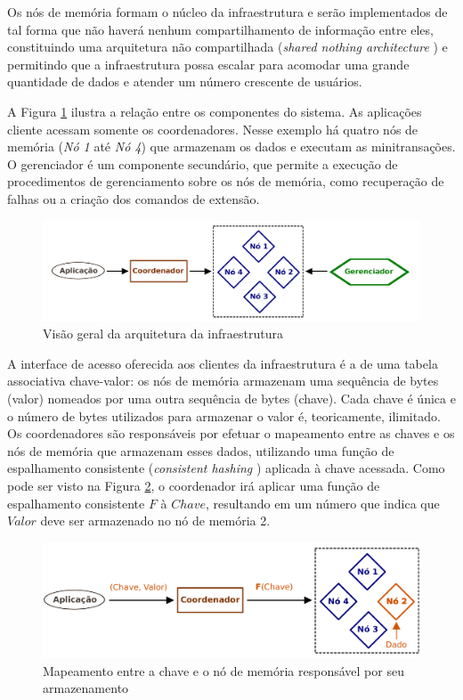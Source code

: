 \documentclass[11pt,twoside,a4paper]{book}
\begin{document}
Os nós de memória formam o núcleo da infraestrutura e serão implementados de tal forma que não haverá nenhum compartilhamento de informação entre eles, constituindo uma arquitetura não compartilhada (\emph{shared nothing architecture} \cite{shared_nothing}) e permitindo que a infraestrutura possa escalar para acomodar uma grande quantidade de dados e atender um número crescente de usuários.

A Figura \ref{fig:overview_arquitetura} ilustra a relação entre os componentes do sistema. As aplicações cliente acessam somente os coordenadores. Nesse exemplo há quatro nós de memória (\emph{Nó 1} até \emph{Nó 4}) que armazenam os dados e executam as minitransações. O gerenciador é um componente secundário, que permite a execução de procedimentos de gerenciamento sobre os nós de memória, como recuperação de falhas ou a criação dos comandos de extensão.

\begin{figure}
  \centering
  \includegraphics[width=.90\textwidth]{overview_arquitetura} 
  \caption{Visão geral da arquitetura da infraestrutura}
  \label{fig:overview_arquitetura} 
\end{figure}

A interface de acesso oferecida aos clientes da infraestrutura é a de uma tabela associativa chave-valor: os nós de memória armazenam uma sequência de bytes (valor) nomeados por uma outra sequência de bytes (chave). Cada chave é única e o número de bytes utilizados para armazenar o valor é, teoricamente, ilimitado. Os coordenadores são responsáveis por efetuar o mapeamento entre as chaves e os nós de memória que armazenam esses dados, utilizando uma função de espalhamento consistente (\emph{consistent hashing} \cite{consistent_hashing}) aplicada à chave acessada. Como pode ser visto na Figura \ref{fig:funcao_espalhamento}, o coordenador irá aplicar uma função de espalhamento consistente \textbf{$F$} à $Chave$, resultando em um número que indica que $Valor$ deve ser armazenado no nó de memória 2. 

\begin{figure}
  \centering
  \includegraphics[width=.80\textwidth]{funcao_espalhamento} 
  \caption{Mapeamento entre a chave e o nó de memória responsável por seu armazenamento}
  \label{fig:funcao_espalhamento} 
\end{figure}
\end{document}
